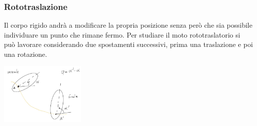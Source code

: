 \subsubsection{Rototraslazione}
Il corpo rigido andrà a modificare la propria posizione senza però che sia possibile individuare un punto che rimane fermo. Per studiare il moto rototraslatorio si può lavorare considerando due spostamenti successivi, prima una traslazione e poi una rotazione.
\begin{center}
    \includegraphics[height=3cm]{../lezione2/img5.JPG}
\end{center} 
